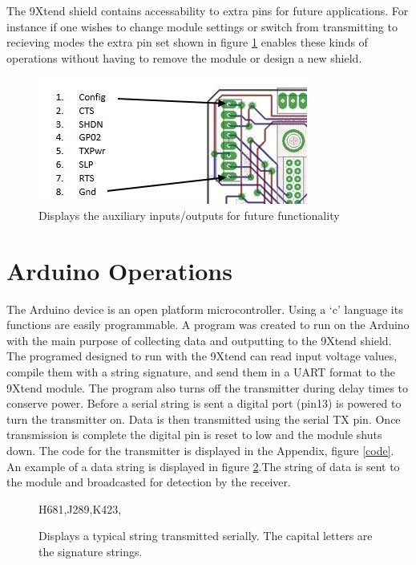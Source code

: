 \documentclass[paper=a4, fontsize=11pt]{scrartcl}
\numberwithin{equation}{section}		%
\numberwithin{figure}{section}			%
\numberwithin{table}{section}				%
\begin{document}
The 9Xtend shield contains accessability to extra pins for future applications. For instance if one wishes to change module settings or switch from transmitting to recieving modes the extra pin set shown in figure \ref{auxi} enables these kinds of operations without having to remove the module or design a new shield.

\begin{figure}[H]
\centering
\includegraphics[width=0.75\linewidth]{auxi}
\caption{ Displays the auxiliary inputs/outputs for future functionality}
\label{auxi}
\end{figure}

\section{Arduino Operations}

The Arduino device is an open platform microcontroller. Using a `c' language its functions are easily programmable. A program was created to run on the Arduino with the main purpose of collecting data and outputting to the 9Xtend shield. The programed designed to run with the 9Xtend can read input voltage values, compile them with a string signature, and send them in a UART format to the 9Xtend module. The program also turns off the transmitter during delay times to conserve power. Before a serial string is sent a digital port (pin13) is powered to turn the transmitter on. Data is then transmitted using the serial TX pin. Once transmission is complete the digital pin is reset to low and the module shuts down. The code for the transmitter is displayed in the Appendix, figure \ref{code}. An example of a data string is displayed in figure \ref{string}.The string of data is sent to the module and broadcasted for detection by the receiver.

\begin{figure}[H]
\centering
\normalfont \normalsize \textsc{H681,J289,K423,} \\ [30pt]
\caption{ Displays a typical string transmitted serially. The capital letters are the signature strings.}
\label{string}
\end{figure}
\end{document}
